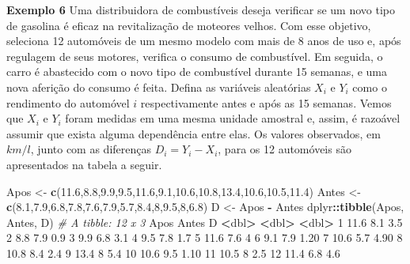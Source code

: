 \documentclass[10pt,a4paper]{book}
\newenvironment{Shaded}{\begin{snugshade}}{\end{snugshade}}
\newcommand{\KeywordTok}[1]{\textcolor[rgb]{0.13,0.29,0.53}{\textbf{#1}}}
\newcommand{\DecValTok}[1]{\textcolor[rgb]{0.00,0.00,0.81}{#1}}
\newcommand{\FloatTok}[1]{\textcolor[rgb]{0.00,0.00,0.81}{#1}}
\newcommand{\StringTok}[1]{\textcolor[rgb]{0.31,0.60,0.02}{#1}}
\newcommand{\CommentTok}[1]{\textcolor[rgb]{0.56,0.35,0.01}{\textit{#1}}}
\newcommand{\OperatorTok}[1]{\textcolor[rgb]{0.81,0.36,0.00}{\textbf{#1}}}
\newcommand{\ErrorTok}[1]{\textcolor[rgb]{0.64,0.00,0.00}{\textbf{#1}}}
\newcommand{\NormalTok}[1]{#1}
\begin{document}
\textbf{Exemplo 6} Uma distribuidora de combustíveis deseja verificar se
um novo tipo de gasolina é eficaz na revitalização de moteores velhos.
Com esse objetivo, seleciona 12 automóveis de um mesmo modelo com mais
de 8 anos de uso e, após regulagem de seus motores, verifica o consumo
de combustível. Em seguida, o carro é abastecido com o novo tipo de
combustível durante 15 semanas, e uma nova aferição do consumo é feita.
Defina as variáveis aleatórias \(X_i\) e \(Y_i\) como o rendimento do
automóvel \(i\) respectivamente antes e após as 15 semanas. Vemos que
\(X_i\) e \(Y_i\) foram medidas em uma mesma unidade amostral e, assim,
é razoável assumir que exista alguma dependência entre elas. Os valores
observados, em \(km/l\), junto com as diferenças \(D_i = Y_i - X_i\),
para os 12 automóveis são apresentados na tabela a seguir.

\begin{Shaded}
\begin{Highlighting}[]
\NormalTok{Apos <-}\StringTok{ }\KeywordTok{c}\NormalTok{(}\FloatTok{11.6}\NormalTok{,}\FloatTok{8.8}\NormalTok{,}\FloatTok{9.9}\NormalTok{,}\FloatTok{9.5}\NormalTok{,}\FloatTok{11.6}\NormalTok{,}\FloatTok{9.1}\NormalTok{,}\FloatTok{10.6}\NormalTok{,}\FloatTok{10.8}\NormalTok{,}\FloatTok{13.4}\NormalTok{,}\FloatTok{10.6}\NormalTok{,}\FloatTok{10.5}\NormalTok{,}\FloatTok{11.4}\NormalTok{)}
\NormalTok{Antes <-}\StringTok{ }\KeywordTok{c}\NormalTok{(}\FloatTok{8.1}\NormalTok{,}\FloatTok{7.9}\NormalTok{,}\FloatTok{6.8}\NormalTok{,}\FloatTok{7.8}\NormalTok{,}\FloatTok{7.6}\NormalTok{,}\FloatTok{7.9}\NormalTok{,}\FloatTok{5.7}\NormalTok{,}\FloatTok{8.4}\NormalTok{,}\DecValTok{8}\NormalTok{,}\FloatTok{9.5}\NormalTok{,}\DecValTok{8}\NormalTok{,}\FloatTok{6.8}\NormalTok{)}
\NormalTok{D <-}\StringTok{ }\NormalTok{Apos }\OperatorTok{-}\StringTok{ }\NormalTok{Antes}
\NormalTok{dplyr}\OperatorTok{::}\KeywordTok{tibble}\NormalTok{(Apos, Antes, D)}
\CommentTok{# A tibble: 12 x 3}
\NormalTok{    Apos Antes     D}
   \OperatorTok{<}\NormalTok{dbl}\OperatorTok{>}\StringTok{ }\ErrorTok{<}\NormalTok{dbl}\OperatorTok{>}\StringTok{ }\ErrorTok{<}\NormalTok{dbl}\OperatorTok{>}
\StringTok{ }\DecValTok{1}  \FloatTok{11.6}   \FloatTok{8.1}  \FloatTok{3.5} 
 \DecValTok{2}   \FloatTok{8.8}   \FloatTok{7.9}  \FloatTok{0.9} 
 \DecValTok{3}   \FloatTok{9.9}   \FloatTok{6.8}  \FloatTok{3.1} 
 \DecValTok{4}   \FloatTok{9.5}   \FloatTok{7.8}  \FloatTok{1.7} 
 \DecValTok{5}  \FloatTok{11.6}   \FloatTok{7.6}  \DecValTok{4}   
 \DecValTok{6}   \FloatTok{9.1}   \FloatTok{7.9}  \FloatTok{1.20}
 \DecValTok{7}  \FloatTok{10.6}   \FloatTok{5.7}  \FloatTok{4.90}
 \DecValTok{8}  \FloatTok{10.8}   \FloatTok{8.4}  \FloatTok{2.4} 
 \DecValTok{9}  \FloatTok{13.4}   \DecValTok{8}    \FloatTok{5.4} 
\DecValTok{10}  \FloatTok{10.6}   \FloatTok{9.5}  \FloatTok{1.10}
\DecValTok{11}  \FloatTok{10.5}   \DecValTok{8}    \FloatTok{2.5} 
\DecValTok{12}  \FloatTok{11.4}   \FloatTok{6.8}  \FloatTok{4.6} 
\end{Highlighting}
\end{Shaded}
\end{document}
